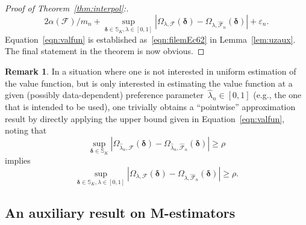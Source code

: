 \documentclass[11pt, a4paper]{article}
\theoremstyle{definition}
\newtheorem{remark}{Remark}[section]
\begin{document}
\begin{proof}[Proof of Theorem~\ref{thm:interpol}:]
%
\begin{equation*}
2\alpha(\mathcal{F})/m_n +  \sup_{\bm{\delta} \in \mathbb{S}_K, \lambda \in [0, 1]} |\Omega_{\lambda, \mathcal{F}}(\bm{\delta}) - \Omega_{\lambda, \hat{\mathcal{F}}_n}(\bm{\delta}) | + \varepsilon_n.
\end{equation*}
%
Equation~\eqref{eqn:valfun} is established as~\eqref{eqn:filemEc62} in Lemma~\ref{lem:uzaux}. The final statement in the theorem is now obvious.
\end{proof}

%
\begin{remark}\label{rem:pointwval}
In a situation where one is not interested in uniform estimation of the value function, but is only interested in estimating the value function at a given (possibly data-dependent) preference parameter~$\hat{\lambda}_n \in [0, 1]$ (e.g., the one that is intended to be used), one trivially obtains a ``pointwise''  approximation result by directly applying the upper bound given in Equation~\eqref{eqn:valfun}, noting that
$$\sup_{\bm{\delta} \in \mathbb{S}_K} \left|\Omega_{\hat{\lambda}_n, \mathcal{F}}(\bm{\delta}) - \Omega_{\hat{\lambda}_n, \hat{\mathcal{F}}_n}(\bm{\delta})  \right| \geq \rho$$
%
implies
%
$$\sup_{\bm{\delta} \in \mathbb{S}_K, \lambda \in [0, 1]} \left|\Omega_{\lambda, \mathcal{F}}(\bm{\delta}) - \Omega_{\lambda, \hat{\mathcal{F}}_n}(\bm{\delta})  \right| \geq \rho.$$ 
\end{remark}

\subsection{An auxiliary result on M-estimators}\label{sec:auxMest}
\end{document}
